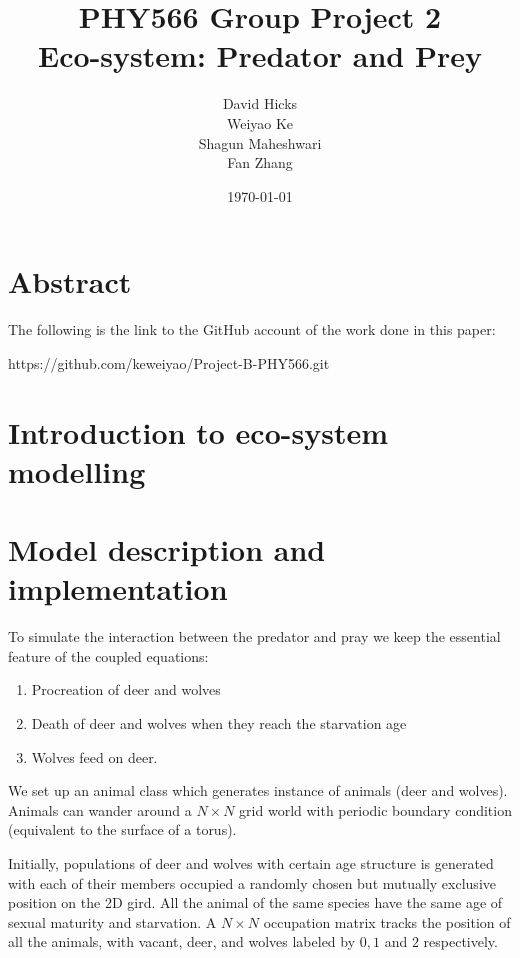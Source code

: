 \documentclass[a4paper,12pt]{article}
\begin{document}
\title{PHY566 Group Project 2 \\ 
	Eco-system: Predator and Prey}
\date{\today}
\author{David Hicks\\ Weiyao Ke \\ Shagun Maheshwari \\ Fan Zhang}

\maketitle
\section{Abstract}

The following is the link to the GitHub account of the work done in this paper: \\
\begin{center}
https://github.com/keweiyao/Project-B-PHY566.git
\end{center}

\section{Introduction to eco-system modelling}

\section{Model description and implementation}
To simulate the interaction between the predator and pray we keep the essential feature of the coupled equations:
\begin{enumerate}
	\item Procreation of deer and wolves
	\item Death of deer and wolves when they reach the starvation age
	\item Wolves feed on deer.
\end{enumerate}

We set up an animal class which generates instance of animals (deer and wolves). Animals can wander around a $N \times N$ grid world with periodic boundary condition (equivalent to the surface of a torus).

Initially, populations of deer and wolves with certain age structure is generated with each of their members occupied a randomly chosen but mutually exclusive position on the 2D gird. All the animal of the same species have the same age of sexual maturity and starvation.  A $N \times N$ occupation matrix tracks the position of all the animals, with vacant, deer, and wolves labeled by $0, 1$  and $2$ respectively. 
\end{document}
